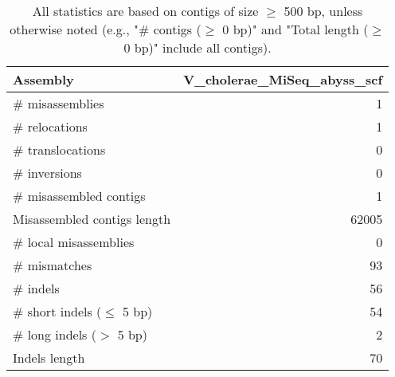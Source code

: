 \documentclass[12pt,a4paper]{article}
\begin{document}
\begin{table}[ht]
\begin{center}
\caption{All statistics are based on contigs of size $\geq$ 500 bp, unless otherwise noted (e.g., "\# contigs ($\geq$ 0 bp)" and "Total length ($\geq$ 0 bp)" include all contigs).}
\begin{tabular}{|l*{1}{|r}|}
\hline
Assembly & V\_cholerae\_MiSeq\_abyss\_scf \\ \hline
\# misassemblies & 1 \\ \hline
\hspace{5mm}\# relocations & 1 \\ \hline
\hspace{5mm}\# translocations & 0 \\ \hline
\hspace{5mm}\# inversions & 0 \\ \hline
\# misassembled contigs & 1 \\ \hline
Misassembled contigs length & 62005 \\ \hline
\# local misassemblies & 0 \\ \hline
\# mismatches & 93 \\ \hline
\# indels & 56 \\ \hline
\hspace{5mm}\# short indels ($\leq$ 5 bp) & 54 \\ \hline
\hspace{5mm}\# long indels ($>$ 5 bp) & 2 \\ \hline
Indels length & 70 \\ \hline
\end{tabular}
\end{center}
\end{table}
\end{document}
